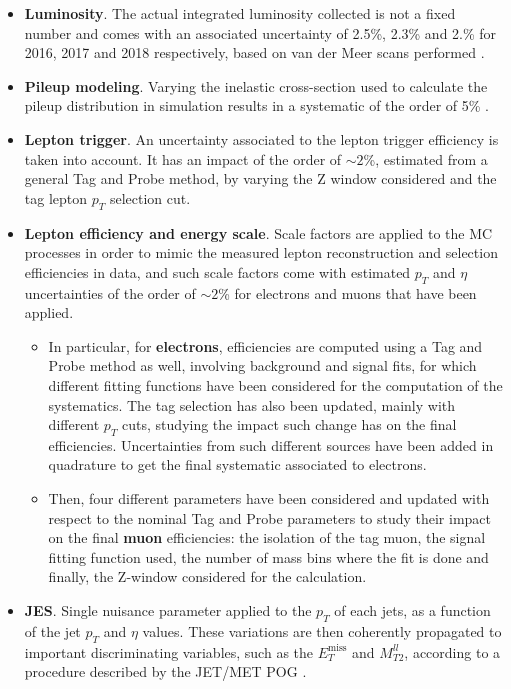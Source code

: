 \documentclass[a4paper, 10pt, openright]{report}
\begin{document}
\begin{itemize}
\item \textbf{Luminosity}. The actual integrated luminosity collected is not a fixed number and comes with an associated uncertainty of 2.5\%, 2.3\% and 2.\% for 2016, 2017 and 2018 respectively, based on van der Meer scans performed \cite{Lumi2016, Lumi2017, Lumi2018}.
\item \textbf{Pileup modeling}. Varying the inelastic cross-section used to calculate the pileup distribution in simulation results in a systematic of the order of 5\% \cite{PUmodel}.
\item \textbf{Lepton trigger}. An uncertainty associated to the lepton trigger efficiency is taken into account. It has an impact of the order of $\sim 2$\%, estimated from a general Tag and Probe method, by varying the Z window considered and the tag lepton $p_T$ selection cut. 
\item \textbf{Lepton efficiency and energy scale}. Scale factors are applied to the \ac{MC} processes in order to mimic the measured lepton reconstruction and selection efficiencies in data, and such scale factors come with estimated $p_T$ and $\eta$ uncertainties of the order of $\sim2$\% for electrons and muons that have been applied.  
\begin{itemize}
\item In particular, for \textbf{electrons}, efficiencies are computed using a Tag and Probe method as well, involving background and signal fits, for which different fitting functions have been considered for the computation of the systematics. The tag selection has also been updated, mainly with different $p_T$ cuts, studying the impact such change has on the final efficiencies. Uncertainties from such different sources have been added in quadrature to get the final systematic associated to electrons.
\item Then, four different parameters have been considered and updated with respect to the nominal Tag and Probe parameters to study their impact on the final \textbf{muon} efficiencies: the isolation of the tag muon, the signal fitting function used, the number of mass bins where the fit is done and finally, the Z-window considered for the calculation. 
\end{itemize}
\item \textbf{\ac{JES}}. Single nuisance parameter applied to the $p_T$ of each jets, as a function of the jet $p_T$ and $\eta$ values. These variations are then coherently propagated to important discriminating variables, such as the $E_T^\text{miss}$ and $M_{T2}^{ll}$, according to a procedure described by the JET/MET \ac{POG} \cite{JETMETPOG}.

\end{itemize}
\end{document}

